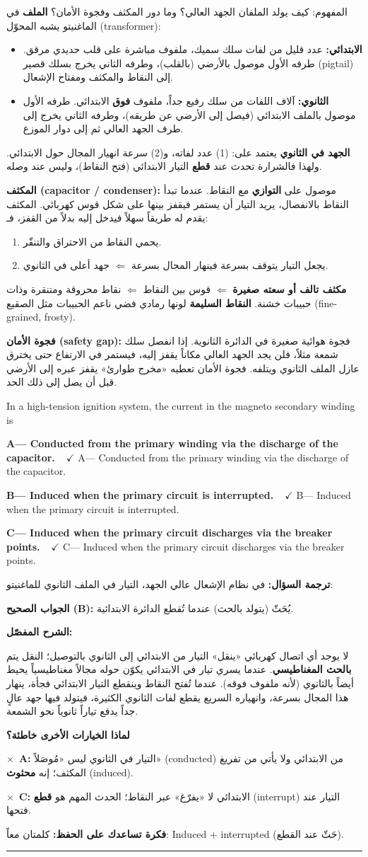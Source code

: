 \documentclass[11pt,a4paper]{article}
\newcommand{\en}[1]{\textenglish{#1}}
\newcommand{\correctletter}{}
\newcommand{\opt}[2]{%
  \ifdefstring{\correctletter}{#1}%
    {\textcolor{ansgreen}{\textbf{#1— #2\ \ $\checkmark$}}}%
    {#1— #2}\par}
\newcommand{\Q}[6]{%
  \renewcommand{\correctletter}{#6}%
  \par\bigskip
  \phantomsection\label{q#1}%
  \begin{tcolorbox}[enhanced,breakable,colback=qback,colframe=qframe,
      arc=2mm,boxrule=0.8pt,fonttitle=\bfseries,
      title={\en{Question #1}}]
    \begin{english}
      #2\par\smallskip
      \opt{A}{#3}\opt{B}{#4}\opt{C}{#5}
    \end{english}
  \end{tcolorbox}}
\newcommand{\tr}[1]{\textbf{\textcolor{qframe}{ترجمة السؤال:}} #1\par}
\newcommand{\ans}[2]{%
  \begin{tcolorbox}[colback=ansback,colframe=ansgreen,boxrule=0.6pt,arc=1.5mm,
      left=4pt,right=4pt,top=2pt,bottom=2pt]
    \textbf{\textcolor{ansgreen}{الجواب الصحيح (\en{#1}):}} #2
  \end{tcolorbox}}
\newcommand{\sharh}[1]{\textbf{\textcolor{conceptc}{الشرح المفصّل:}}\par #1\par}
\newcommand{\nohead}{\textbf{\textcolor{wrongc}{لماذا الخيارات الأخرى خاطئة؟}}\par}
\newcommand{\no}[2]{\hspace*{1em}\textcolor{wrongc}{$\times$}\ \textbf{\en{#1}:} #2\par}
\newcommand{\tip}[1]{%
  \begin{tcolorbox}[colback=tipback,colframe=tipframe,boxrule=0.5pt,arc=1.5mm,
      left=4pt,right=4pt,top=2pt,bottom=2pt]
    \textbf{فكرة تساعدك على الحفظ:} #1
  \end{tcolorbox}}
\newcommand{\qsep}{\par\medskip\noindent\textcolor{qframe!40}{\rule{\linewidth}{0.4pt}}\par}
\begin{document}
\begin{concept}{المفهوم: كيف يولد الملفان الجهد العالي؟ وما دور المكثف وفجوة الأمان؟}
\textbf{الملف} في الماغنيتو يشبه المحوّل (\en{transformer}):
\begin{itemize}
  \item \textbf{الابتدائي:} عدد قليل من لفات سلك سميك، ملفوف مباشرة على قلب حديدي مرقق. طرفه الأول موصول بالأرضي (بالقلب)، وطرفه الثاني يخرج بسلك قصير (\en{pigtail}) إلى النقاط والمكثف ومفتاح الإشعال.
  \item \textbf{الثانوي:} آلاف اللفات من سلك رفيع جداً، ملفوف \textbf{فوق} الابتدائي. طرفه الأول موصول بالملف الابتدائي (فيصل إلى الأرضي عن طريقه)، وطرفه الثاني يخرج إلى طرف الجهد العالي ثم إلى دوار الموزع.
\end{itemize}

\textbf{الجهد في الثانوي} يعتمد على: (1) عدد لفاته، و(2) سرعة انهيار المجال حول الابتدائي. ولهذا فالشرارة تحدث عند \textbf{قطع} التيار الابتدائي (فتح النقاط)، وليس عند وصله.

\textbf{المكثف (\en{capacitor / condenser}):} موصول على \textbf{التوازي} مع النقاط. عندما تبدأ النقاط بالانفصال، يريد التيار أن يستمر فيقفز بينها على شكل قوس كهربائي. المكثف يقدم له طريقاً سهلاً فيدخل إليه بدلاً من القفز، فـ:
\begin{enumerate}[label=\arabic*.]
  \item يحمي النقاط من الاحتراق والتنقّر.
  \item يجعل التيار يتوقف بسرعة فينهار المجال بسرعة $\Leftarrow$ جهد أعلى في الثانوي.
\end{enumerate}
\textbf{مكثف تالف أو سعته صغيرة} $\Leftarrow$ قوس بين النقاط $\Leftarrow$ نقاط محروقة ومتنقرة وذات حبيبات خشنة. \textbf{النقاط السليمة} لونها رمادي فضي ناعم الحبيبات مثل الصقيع (\en{fine-grained, frosty}).

\textbf{فجوة الأمان (\en{safety gap}):} فجوة هوائية صغيرة في الدائرة الثانوية. إذا انفصل سلك شمعة مثلاً، فلن يجد الجهد العالي مكاناً يقفز إليه، فيستمر في الارتفاع حتى يخترق عازل الملف الثانوي ويتلفه. فجوة الأمان تعطيه «مخرج طوارئ» يقفز عبره إلى الأرضي قبل أن يصل إلى ذلك الحد.
\end{concept}

\Q{8514}{In a high-tension ignition system, the current in the magneto secondary winding is}
{Conducted from the primary winding via the discharge of the capacitor.}
{Induced when the primary circuit is interrupted.}
{Induced when the primary circuit discharges via the breaker points.}{B}
\tr{في نظام الإشعال عالي الجهد، التيار في الملف الثانوي للماغنيتو:}
\ans{B}{يُحَثّ (يتولد بالحث) عندما تُقطع الدائرة الابتدائية.}
\sharh{لا يوجد أي اتصال كهربائي «ينقل» التيار من الابتدائي إلى الثانوي بالتوصيل؛ النقل يتم \textbf{بالحث المغناطيسي}. عندما يسري تيار في الابتدائي يكوّن حوله مجالاً مغناطيسياً يحيط أيضاً بالثانوي (لأنه ملفوف فوقه). عندما تُفتح النقاط وينقطع التيار الابتدائي فجأة، ينهار هذا المجال بسرعة، وانهياره السريع يقطع لفات الثانوي الكثيرة، فيتولد فيها جهد عالٍ جداً يدفع تياراً ثانوياً نحو الشمعة.}
\nohead
\no{A}{التيار في الثانوي ليس «مُوصَلاً» (\en{conducted}) من الابتدائي ولا يأتي من تفريغ المكثف؛ إنه \textbf{محثوث} (\en{induced}).}
\no{C}{الابتدائي لا «يفرّغ» عبر النقاط؛ الحدث المهم هو \textbf{قطع} (\en{interrupt}) التيار عند فتحها.}
\tip{كلمتان معاً: \en{Induced} + \en{interrupted} (حَثّ عند القطع).}
\qsep
\end{document}
